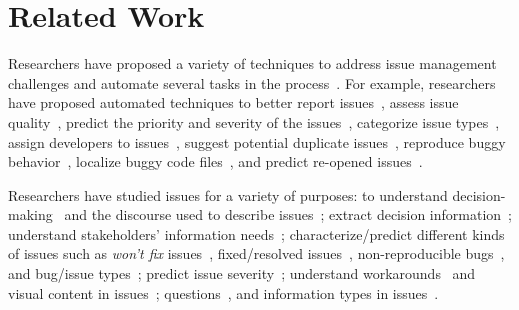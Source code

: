 \section{Related Work}
\label{sec:related_work}







Researchers have proposed a variety of techniques to address issue management challenges and automate several tasks in the process~\cite{zou2018practitioners,Adnan:msr25}. For example, researchers have proposed automated techniques to better report issues~\cite{song_toward_2022,Fazzini:TSE22,song2023burt}, assess issue quality~\cite{mahmud:icpc2025,chaparro2019assessing,chaparro2017detecting,song2020bee}, 
predict the priority and severity of the issues~\cite{umer2019cnn,tian2015automated}, categorize issue types~\cite{somasundaram2012automatic,catolino2019not}, assign developers to issues~\cite{xia2013accurate,chaitra2022bug}, suggest potential duplicate issues~\cite{Zhou2012a,he2020duplicate,zhang2023duplicate}, reproduce buggy behavior~\cite{Zhao2019,feng2022gifdroid,zhang2023automatically,Zhao2019,zhao2022recdroid+}, localize buggy code files~\cite{akbar2020large,lee2018bench4bl,Ye2016b,ciborowska2022fast,Wong2014,Kochhar2014,florez2021combining,chaparro2019using,chaparro2017using,chaparro2019reformulating,saha2024toward,mahmud2024using,chaparro2016reduction},  and predict re-opened issues~\cite{zimmermann2012characterizing,shihab2010predicting}. 

Researchers have studied issues for a variety of purposes: to understand  decision-making~\cite{hesse2016documented} and 
the discourse used to describe issues~\cite{chaparro2017detecting,chaparro2016vocabulary}; extract decision information~\cite{mahadi2020cross}; understand stakeholders' information needs~\cite{Breu2010}; characterize/predict different kinds of issues such as \textit{won't fix} issues~\cite{panichella2021won}, fixed/resolved issues~\cite{Guo2010}, non-reproducible bugs~\cite{rahman2022works}, and bug/issue types~\cite{Tan2014,catolino2019not,limsettho2016unsupervised}; predict issue severity~\cite{Sureka2010}; understand workarounds~\cite{yan2023programmers} and visual content in issues~\cite{agrawal2022understanding};  
questions~\cite{huang2019empirical}, and information types in issues~\cite{arya2019analysis}.











